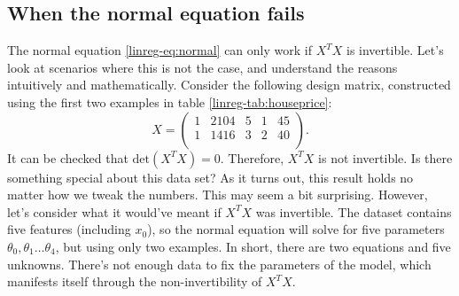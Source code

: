 \documentclass{article}
\theoremstyle{definition}
\begin{document}
\subsection{When the normal equation fails}
The normal equation \eqref{linreg-eq:normal} can only work if $X^TX$ is invertible. Let's look at scenarios where this is not the case, and understand the reasons intuitively and mathematically. Consider the following design matrix, constructed using the first two examples in table \ref{linreg-tab:houseprice}:
\begin{equation}
    X =
    \begin{pmatrix}
        1 & 2104 & 5 & 1 & 45 \\
        1 & 1416 & 3 & 2 & 40 \\
    \end{pmatrix}.
    \label{linreg-eq:design-mat-noninvert}
\end{equation}
It can be checked that $\text{det}(X^TX)=0$. Therefore, $X^TX$ is not invertible. Is there something special about this data set? As it turns out, this result holds no matter how we tweak the numbers. This may seem a bit surprising. However, let's consider what it would've meant if $X^TX$ was invertible. The dataset contains five features (including $x_0$), so the normal equation will solve for five parameters $\theta_0,\theta_1\dots\theta_4$, but using only two examples. In short, there are two equations and five unknowns. There's not enough data to fix the parameters of the model, which manifests itself through the non-invertibility of $X^TX$.
\end{document}
